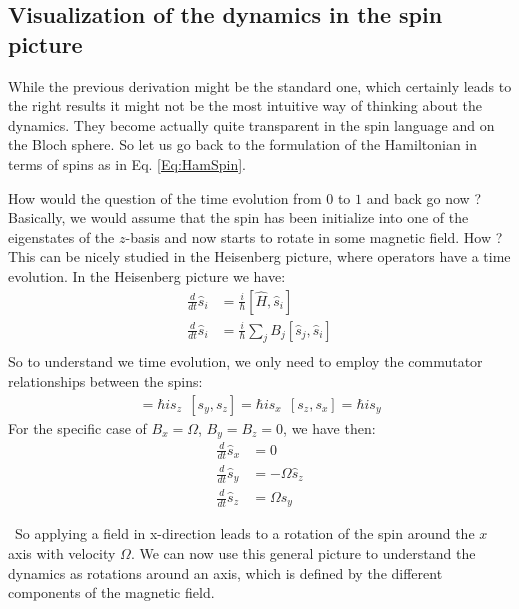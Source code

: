 \subsection{Visualization of the dynamics in the spin picture}

While the previous derivation might be the standard one, which certainly leads to the right results it might not be the most intuitive way of thinking about the dynamics. They become actually quite transparent in the spin language and on the Bloch sphere. So let us go back to the formulation of the Hamiltonian in terms of spins as in Eq. \eqref{Eq:HamSpin}.

How would the question of the time evolution from $0$ to $1$ and back go now ? Basically, we would assume that the spin has been initialize into one of the eigenstates of the $z$-basis and now starts to rotate in some magnetic field. How ? This can be nicely studied in the Heisenberg picture, where operators have a time evolution. In the Heisenberg picture we have:
\begin{align}
\frac{d}{dt} \hat{s}_i &= \frac{i}{\hbar}\left[\hat{H},\hat{s}_i\right]\\
\frac{d}{dt} \hat{s}_i &= \frac{i}{\hbar}\sum_j B_j \left[\hat{s}_j,\hat{s}_i\right]\\
 \end{align}
So to understand we time evolution, we only need to employ the commutator relationships between the spins:
\begin{align}
[ s_x, s_y] = \hbar is_z~~[ s_y, s_z] = \hbar is_x~~[ s_z, s_x] = \hbar is_y
\end{align}
For the specific case of $B_x=\Omega$, $B_y = B_z = 0$, we have then:
\begin{align}
\frac{d}{dt} \hat{s}_x &= 0\\
\frac{d}{dt} \hat{s}_y &= -\Omega \hat{s}_z\\
\frac{d}{dt} \hat{s}_z &= \Omega \hat{s}_y
 \end{align}
 
\ So applying a field in x-direction leads to a rotation of the spin around the $x$ axis with velocity $\Omega$. We can now use this general picture to understand the dynamics as rotations around an axis, which is defined by the different components of the magnetic field.